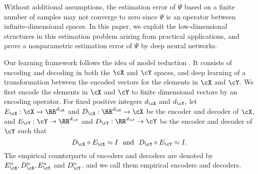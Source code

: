 \documentclass[11pt]{article} %
\newcommand{\hao}[1]{{\color{blue} #1}}
\begin{document}

Without additional assumptions, %
the estimation error of $\Psi$ based on a finite number of samples may not converge to zero since $\Psi$ is an operator between infinite-dimensional spaces. %
In this paper, we exploit the low-dimensional structures in this estimation problem arising from practical applications, and prove a nonparametric estimation error of $\Psi$ by deep neural networks. %

Our learning framework follows the idea of model reduction \citep{bhattacharya2020model}. It consists of encoding and decoding in both the $\cX$ and $\cY$ spaces, and deep learning of a transformation between the encoded vectors for the elements in $\cX$ and $\cY$. 
We first encode the elements in $\cX$ and $\cY$ to finite dimensional vectors by an encoding operator. For fixed positive integers $d_\cX$ and $d_\cY$, let $E_{\cX}:\cX\rightarrow \RR^{d_\cX}$ and $ D_{\cX}: \RR^{d_{\cX}}\rightarrow \cX$ be the encoder and decoder of $\cX$, and $E_{\cY}:\cY\rightarrow \RR^{d_{\cY}}$ and $ D_{\cY}: \RR^{d_{\cY}}\rightarrow \cY$ be the encoder and decoder of $\cY$ such that
$$D_{\cX} \circ E_{\cX} \approx I \ \text{ and } \ D_{\cY}\circ E_{\cY} \approx I.$$
The empirical counterparts of encoders and decoders are denoted by $E_{\cX}^n, D_{\cX}^n, E_{\cY}^n$ and $D_{\cY}^n$, and we call them empirical encoders and decoders.

\end{document}
